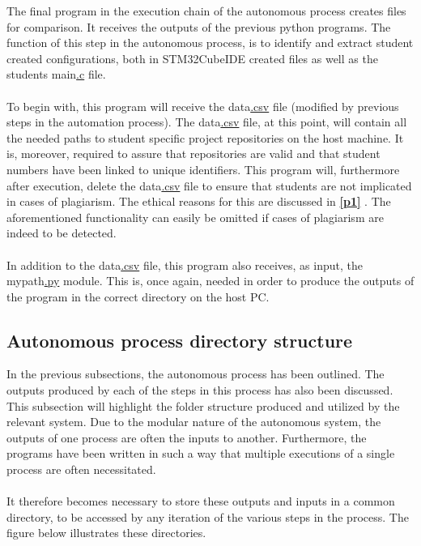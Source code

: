 The final program in the execution chain of the autonomous process creates files for comparison. It receives the outputs of the previous python programs. The function of this step in the autonomous process, is to identify and extract student created configurations, both in STM32CubeIDE created files as well as the students main\hyperref[listAbr]{.c} file.
\\\\
To begin with, this program will receive the data\hyperref[listExt]{.csv} file (modified by previous steps in the automation process). The data\hyperref[listExt]{.csv} file, at this point, will contain all the needed paths to student specific project repositories on the host machine. It is, moreover, required to assure that repositories are valid and that student numbers have been linked to unique identifiers. This program will, furthermore after execution, delete the data\hyperref[listExt]{.csv} file to ensure that students are not implicated in cases of plagiarism. The ethical reasons for this are discussed in \textbf{\ref{p1} }. The aforementioned functionality can easily be omitted if cases of plagiarism are indeed to be detected. 
\\\\
In addition to the data\hyperref[listExt]{.csv} file, this program also receives, as input, the mypath\hyperref[listExt]{.py} module. This is, once again, needed in order to produce the outputs of the program in the correct directory on the host PC.

\subsection{Autonomous process directory structure}
\label{p4}
In the previous subsections, the autonomous process has been outlined. The outputs produced by each of the steps in this process has also been discussed. This subsection will highlight the folder structure produced and utilized by the relevant system. Due to the modular nature of the autonomous system, the outputs of one process are often the inputs to another. Furthermore, the programs have been written in such a way that multiple executions of a single process are often necessitated.
\\\\
It therefore becomes necessary to store these outputs and inputs in a common directory, to be accessed by any iteration of the various steps in the process. The figure below illustrates these directories.

